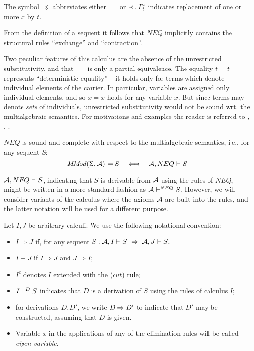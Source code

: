 \noindent
 The symbol $\preceq$ abbreviates either $=$ or $\mathbin{\prec}$. 
$\Gamma_t^x$ indicates replacement of one or more $x$ by $t$.

%
\begin{REMARK} \label{re:1}
{From the definition of a sequent it follows that $NEQ$ implicitly contains the 
structural rules ``exchange'' and ``contraction''.}

Two peculiar features of this calculus are the absence of the unrestricted substitutivity,
and that $=$ is only a partial equivalence.
  The equality $t=t$ represents ``deterministic equality'' -- it holds only for terms which
denote individual elements of the carrier. In particular, 
variables are assigned only individual elements, and so $x=x$ holds for any
variable $x$. But since
terms may denote {\em sets} of individuals, unrestricted substitutivity would not
be sound wrt. the multialgebraic semantics. For motivations and examples the reader
is referred to \cite{WM}, \cite{Top}, \cite{Broy}.
\end{REMARK}
%
\begin{THEOREM}\label{th:cmpl} {\em \cite{WM}}
$NEQ$ is sound and complete with respect to the multialgebraic semantics, i.e.,
for any sequent $S$:
\[\MMod(\Sigma,\Ax)\models S \ \ \iff \ \ \der{\Ax, NEQ}{}S\]
\end{THEOREM}
\noindent
 ${{\cal {A}},NEQ}\vdash^{{}}S$,  indicating that $S$ is derivable from ${\cal {A}}$
using the rules of $NEQ$, might be written in a more standard fashion as
 ${\cal {A}}{}\vdash^{{NEQ}}S$. However, we will consider variants of the calculus
 where the axioms ${\cal {A}}$ are built into the rules, and the latter notation will be used
 for a different purpose.

%
\begin{DEFINITION} Let $I, J$ be arbitrary
calculi. We use the following notational convention:
\begin{itemize}\MyLPar
\item $I \Rightarrow J$ if, for any sequent $S : {{\cal {A}}, I}\vdash^{{}}S 
\ \Rightarrow\  {{\cal {A}}, J}\vdash^{{}}S;$
\item $I\equiv J$ if $I\Rightarrow J$ and $J\Rightarrow I$;
\item $I^c$ denotes $I$ extended with the 
($cut$) rule;
\item ${I}\vdash^{{D}}S$ indicates that $D$ is a derivation of $S$ 
using the rules of calculus $I$;
\item for derivations $D, D'$, we write $D\mathrel\Rightarrow D'$ to indicate that $D'$
may be constructed, assuming that $D$ is given.
\item Variable $x$ in the applications of any of the elimination rules will be called
{\em eigen-variable}.
\end{itemize}
\end{DEFINITION}

